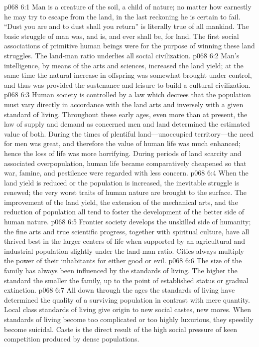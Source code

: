 \vs p068 6:1 Man is a creature of the soil, a child of nature; no matter how earnestly he may try to escape from the land, in the last reckoning he is certain to fail. “Dust you are and to dust shall you return” is literally true of all mankind. The basic struggle of man was, and is, and ever shall be, for land. The first social associations of primitive human beings were for the purpose of winning these land struggles. The land\hyp{}man ratio underlies all social civilization.\plusone
\vs p068 6:2 Man’s intelligence, by means of the arts and sciences, increased the land yield; at the same time the natural increase in offspring was somewhat brought under control, and thus was provided the sustenance and leisure to build a cultural civilization.\plusone
\pc \vs p068 6:3 Human society is controlled by a law which decrees that the population must vary directly in accordance with the land arts and inversely with a given standard of living. Throughout these early ages, even more than at present, the law of supply and demand as concerned men and land determined the estimated value of both. During the times of plentiful land---unoccupied territory---the need for men was great, and therefore the value of human life was much enhanced; hence the loss of life was more horrifying. During periods of land scarcity and associated overpopulation, human life became comparatively cheapened so that war, famine, and pestilence were regarded with less concern.
\vs p068 6:4 When the land yield is reduced or the population is increased, the inevitable struggle is renewed; the very worst traits of human nature are brought to the surface. The improvement of the land yield, the extension of the mechanical arts, and the reduction of population all tend to foster the development of the better side of human nature.
\pc \vs p068 6:5 Frontier society develops the unskilled side of humanity; the fine arts and true scientific progress, together with spiritual culture, have all thrived best in the larger centers of life when supported by an agricultural and industrial population slightly under the land\hyp{}man ratio. Cities always multiply the power of their inhabitants for either good or evil.
\vs p068 6:6 The size of the family has always been influenced by the standards of living. The higher the standard the smaller the family, up to the point of established status or gradual extinction.
\vs p068 6:7 All down through the ages the standards of living have determined the quality of a surviving population in contrast with mere quantity. Local class standards of living give origin to new social castes, new mores. When standards of living become too complicated or too highly luxurious, they speedily become suicidal. Caste is the direct result of the high social pressure of keen competition produced by dense populations.
